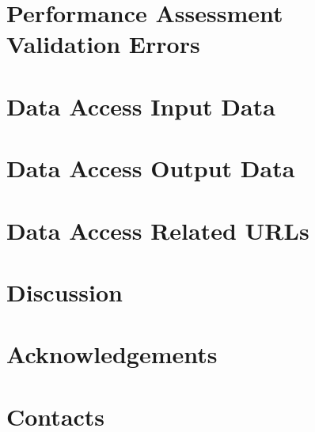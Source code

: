 \section{Performance Assessment Validation Errors}
\PerformanceAssessmentValidationErrors

\section{Data Access Input Data}
\DataAccessInputData

\section{Data Access Output Data}
\DataAccessOutputData

\section{Data Access Related URLs}
\DataAccessRelatedUrls

\section{Discussion}
\JournalDiscussion

\section{Acknowledgements}
\JournalAcknowledgements

\section{Contacts}
\Contacts





  
